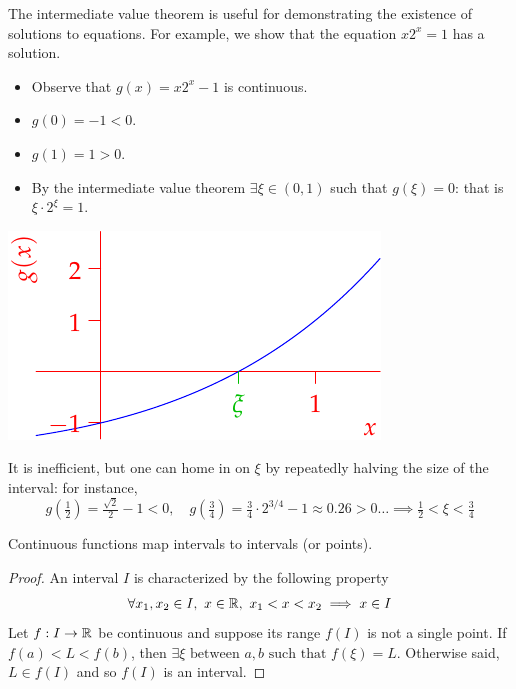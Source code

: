 \begin{example}{}{}
	The intermediate value theorem is useful for demonstrating the existence of solutions to equations. For example, we show that the equation $x2^x=1$ has a solution.\par
	\begin{minipage}[t]{0.6\linewidth}\vspace{0pt}
		\begin{itemize}\itemsep2pt
			\item Observe that $g(x)=x2^x-1$ is continuous.
			\item $g(0)=-1<0$.
			\item $g(1)=1>0$.
			\item By the intermediate value theorem $\exists \xi\in(0,1)$ such that $g(\xi)=0$: that is $\xi\cdot 2^\xi=1$.
		\end{itemize}
	\end{minipage}
	\hfill
	\begin{minipage}[t]{0.39\linewidth}\vspace{-10pt}
		\flushright\includegraphics[scale=0.95]{intval3}
	\end{minipage}
	\bigbreak
	
	It is inefficient, but one can home in on $\xi$ by repeatedly halving the size of the interval: for instance,
	\[
		g(\tfrac 12)=\tfrac{\sqrt 2}2-1<0,\quad 
		g(\tfrac 34)=\tfrac 34\cdot 2^{3/4}-1\approx 0.26>0\ldots
		\implies \tfrac 12<\xi<\tfrac 34
	\]
\end{example}


\begin{cor}{}{}
	Continuous functions map intervals to intervals (or points).
\end{cor}

\begin{proof}
	An interval $I$ is characterized by the following property
	\[
		\forall x_1,x_2\in I,\ x\in\R,\ x_1<x<x_2\implies x\in I
	\]
	Let $f:I\to\mathbb{R}$ be continuous and suppose its range $f(I)$ is not a single point. If $f(a)<L<f(b)$, then $\exists \xi\text{ between $a,b$ such that }f(\xi)=L$. Otherwise said, $L\in f(I)$ and so $f(I)$ is an interval.
\end{proof}


